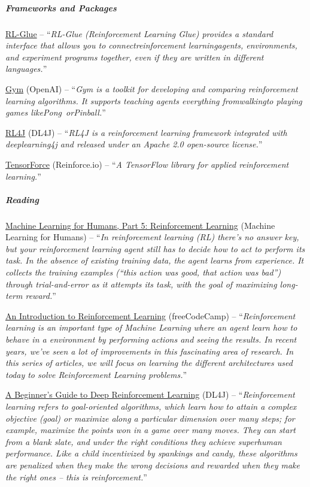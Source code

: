 \documentclass[a4paper, 11pt]{article}
\begin{document}
\subparagraph{\textbf{Frameworks and Packages}}

\href{http://glue.rl-community.org/wiki/Main_Page}{RL-Glue} --
``\emph{RL-Glue (Reinforcement Learning Glue) provides a standard
interface that allows you to connect}\emph{reinforcement
learning}\emph{agents, environments, and experiment programs together,
even if they are written in different languages.}''

\href{https://gym.openai.com/}{Gym} (OpenAI) -- ``\emph{Gym is a toolkit
for developing and comparing reinforcement learning algorithms. It
supports teaching agents everything from}\emph{walking}\emph{to playing
games like}\emph{Pong~}\emph{or}\emph{Pinball}\emph{.}''

\href{https://github.com/deeplearning4j/rl4j}{RL4J} (DL4J) --
``\emph{RL4J is a reinforcement learning framework integrated with
deeplearning4j and released under an Apache 2.0 open-source license.}''

\href{https://github.com/reinforceio/tensorforce}{TensorForce}
(Reinforce.io) -- ``\emph{A TensorFlow library for applied reinforcement
learning.}''

\subparagraph{\textbf{Reading}}

\href{https://medium.com/machine-learning-for-humans/reinforcement-learning-6eacf258b265}{Machine
Learning for Humans, Part 5: Reinforcement Learning} (Machine Learning
for Humans) -- ``\emph{In reinforcement learning (RL) there's no answer
key, but your reinforcement learning agent still has to decide how to
act to perform its task. In the absence of existing training data, the
agent learns from experience. It collects the training examples (``this
action was good, that action was bad'') through trial-and-error as it
attempts its task, with the goal of maximizing long-term reward.}''

\href{https://medium.freecodecamp.org/an-introduction-to-reinforcement-learning-4339519de419}{An
Introduction to Reinforcement Learning} (freeCodeCamp) --
``\emph{Reinforcement learning is an important type of Machine Learning
where an agent learn how to behave in a environment by performing
actions and seeing the results. In recent years, we've seen a lot of
improvements in this fascinating area of research. In this series of
articles, we will focus on learning the different architectures used
today to solve Reinforcement Learning problems.}''

\href{https://deeplearning4j.org/deepreinforcementlearning}{A Beginner's
Guide to Deep Reinforcement Learning} (DL4J) -- ``\emph{Reinforcement
learning refers to goal-oriented algorithms, which learn how to attain a
complex objective (goal) or maximize along a particular dimension over
many steps; for example, maximize the points won in a game over many
moves. They can start from a blank slate, and under the right conditions
they achieve superhuman performance. Like a child incentivized by
spankings and candy, these algorithms are penalized when they make the
wrong decisions and rewarded when they make the right ones -- this is
reinforcement.}''
\end{document}
